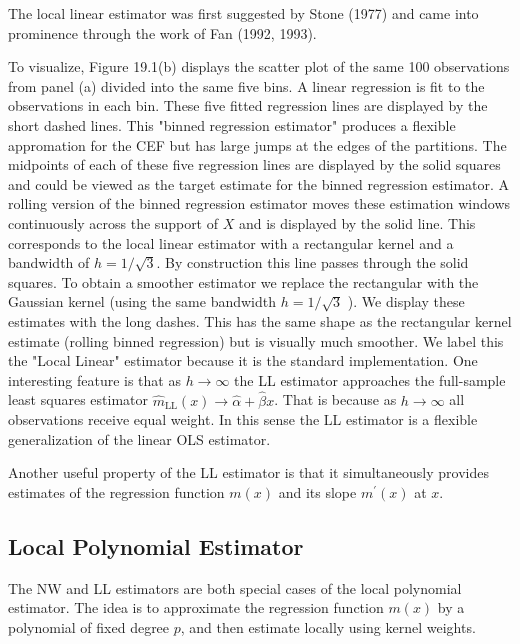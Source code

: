 \documentclass[10pt]{article}
\begin{document}
The local linear estimator was first suggested by Stone (1977) and came into prominence through the work of Fan (1992, 1993).

To visualize, Figure 19.1(b) displays the scatter plot of the same 100 observations from panel (a) divided into the same five bins. A linear regression is fit to the observations in each bin. These five fitted regression lines are displayed by the short dashed lines. This "binned regression estimator" produces a flexible appromation for the CEF but has large jumps at the edges of the partitions. The midpoints of each of these five regression lines are displayed by the solid squares and could be viewed as the target estimate for the binned regression estimator. A rolling version of the binned regression estimator moves these estimation windows continuously across the support of $X$ and is displayed by the solid line. This corresponds to the local linear estimator with a rectangular kernel and a bandwidth of $h=1 / \sqrt{3}$. By construction this line passes through the solid squares. To obtain a smoother estimator we replace the rectangular with the Gaussian kernel (using the same bandwidth $h=1 / \sqrt{3}$ ). We display these estimates with the long dashes. This has the same shape as the rectangular kernel estimate (rolling binned regression) but is visually much smoother. We label this the "Local Linear" estimator because it is the standard implementation. One interesting feature is that as $h \rightarrow \infty$ the LL estimator approaches the full-sample least squares estimator $\widehat{m}_{\mathrm{LL}}(x) \rightarrow \widehat{\alpha}+\widehat{\beta} x$. That is because as $h \rightarrow \infty$ all observations receive equal weight. In this sense the LL estimator is a flexible generalization of the linear OLS estimator.

Another useful property of the LL estimator is that it simultaneously provides estimates of the regression function $m(x)$ and its slope $m^{\prime}(x)$ at $x$.

\subsection{Local Polynomial Estimator}
The NW and LL estimators are both special cases of the local polynomial estimator. The idea is to approximate the regression function $m(x)$ by a polynomial of fixed degree $p$, and then estimate locally using kernel weights.
\end{document}
